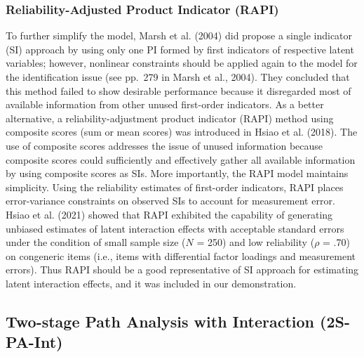 \documentclass[
  man]{apa7}
\begin{document}
\hypertarget{reliability-adjusted-product-indicator-rapi}{%
\subsubsection{Reliability-Adjusted Product Indicator (RAPI)}\label{reliability-adjusted-product-indicator-rapi}}

To further simplify the model, Marsh et al. (2004) did propose a single indicator (SI) approach by using only one PI formed by first indicators of respective latent variables; however, nonlinear constraints should be applied again to the model for the identification issue (see pp.~279 in Marsh et al., 2004). They concluded that this method failed to show desirable performance because it disregarded most of available information from other unused first-order indicators. As a better alternative, a reliability-adjustment product indicator (RAPI) method using composite scores (sum or mean scores) was introduced in Hsiao et al. (2018). The use of composite scores addresses the issue of unused information because composite scores could sufficiently and effectively gather all available information by using composite scores as SIs. More importantly, the RAPI model maintains simplicity. Using the reliability estimates of first-order indicators, RAPI places error-variance constraints on observed SIs to account for measurement error. Hsiao et al. (2021) showed that RAPI exhibited the capability of generating unbiased estimates of latent interaction effects with acceptable standard errors under the condition of small sample size (\(\textit{N}\) = 250) and low reliability (\(\mathit{\rho}\) = .70) on congeneric items (i.e., items with differential factor loadings and measurement errors). Thus RAPI should be a good representative of SI approach for estimating latent interaction effects, and it was included in our demonstration.

\hypertarget{two-stage-path-analysis-with-interaction-2s-pa-int}{%
\subsection{Two-stage Path Analysis with Interaction (2S-PA-Int)}\label{two-stage-path-analysis-with-interaction-2s-pa-int}}
\end{document}
